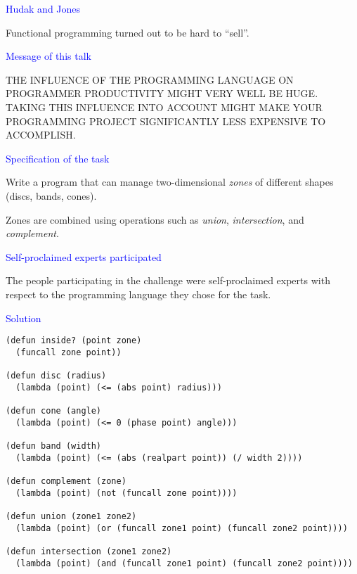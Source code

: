 \documentclass{slides}
\newcommand{\ti}[1]{\begin{center}\Large{\textcolor{blue}{#1}}\end{center}}
\begin{document}
\begin{slide}\ti{Hudak and Jones}

Functional programming turned out to be hard to ``sell''.

\vfill\end{slide}
\begin{slide}\ti{Message of this talk}

THE INFLUENCE OF THE PROGRAMMING LANGUAGE ON PROGRAMMER PRODUCTIVITY
MIGHT VERY WELL BE HUGE.  TAKING THIS INFLUENCE INTO ACCOUNT MIGHT
MAKE YOUR PROGRAMMING PROJECT SIGNIFICANTLY LESS EXPENSIVE TO
ACCOMPLISH.

\vfill\end{slide}
\begin{slide}\ti{Specification of the task}

Write a program that can manage two-dimensional \emph{zones} of
different shapes (discs, bands, cones).

Zones are combined using operations such as \emph{union},
\emph{intersection}, and \emph{complement}.

\vfill\end{slide}
\begin{slide}\ti{Self-proclaimed experts participated}

The people participating in the challenge were self-proclaimed experts
with respect to the programming language they chose for the task.

\vfill\end{slide}
\begin{slide}\ti{Solution}

{\small\begin{verbatim}
(defun inside? (point zone)
  (funcall zone point))

(defun disc (radius)
  (lambda (point) (<= (abs point) radius)))

(defun cone (angle)
  (lambda (point) (<= 0 (phase point) angle)))

(defun band (width)
  (lambda (point) (<= (abs (realpart point)) (/ width 2))))

(defun complement (zone)
  (lambda (point) (not (funcall zone point))))

(defun union (zone1 zone2)
  (lambda (point) (or (funcall zone1 point) (funcall zone2 point))))

(defun intersection (zone1 zone2)
  (lambda (point) (and (funcall zone1 point) (funcall zone2 point))))
\end{verbatim}
}

\vfill\end{slide}


\end{document}
